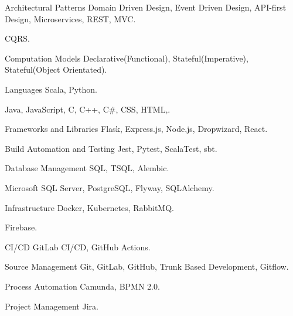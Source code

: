   \begin{cvskills}
    \cvskill
      {Architectural Patterns} 
      { Domain Driven Design, Event Driven Design, API-first Design, Microservices, REST, MVC.}
    
    \cvskill
      {} 
      { CQRS.}
    
    \cvskill
      {Computation Models} 
      { Declarative(Functional), Stateful(Imperative), Stateful(Object Orientated).} 
    
    \cvskill
      {Languages} 
      { Scala, Python.}
    
    \cvskill
      {} 
      { Java, JavaScript, C, C++, C\#, CSS, HTML,.}
    
    \cvskill
      {Frameworks and Libraries} 
      { Flask, Express.js, Node.js, Dropwizard, React.}
        
    \cvskill
      {Build Automation and Testing} 
      { Jest, Pytest, ScalaTest, sbt.} 
    
    \cvskill
      {Database Management} 
      { SQL, TSQL, Alembic.}
    
    \cvskill
      {} 
      { Microsoft SQL Server, PostgreSQL, Flyway, SQLAlchemy.}
    
    \cvskill
      {Infrastructure} 
      { Docker, Kubernetes, RabbitMQ.} 
    
    \cvskill
      {} 
      { Firebase.} 
    
    \cvskill
      {CI/CD} 
      { GitLab CI/CD, GitHub Actions.} 
    
    \cvskill
      {Source Management} 
      { Git, GitLab, GitHub, Trunk Based Development, Gitflow.} 
    
    \cvskill
      {Process Automation}
      { Camunda, BPMN 2.0.}
    
    \cvskill
      {Project Management} 
      { Jira.} 
  \end{cvskills}
